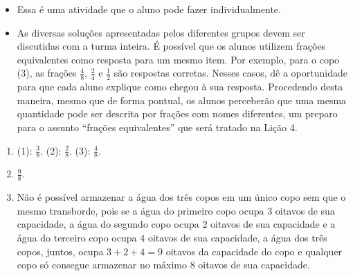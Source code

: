 \begin{multicols}{2}
\begin{orientacoes}
    \begin{itemize} %
    \item       Essa é uma atividade que o aluno pode fazer individualmente.
    \item       As diversas soluções apresentadas pelos diferentes grupos devem ser discutidas com a turma inteira. É possível que os alunos utilizem frações equivalentes como resposta para um mesmo item. Por exemplo, para o copo (3), as frações       $\frac{4}{8}$,       $\frac{2}{4}$ e       $\frac{1}{2}$ são respostas corretas. Nesses casos, dê a oportunidade para que cada aluno explique como chegou à sua resposta. Procedendo desta maneira, mesmo que de forma pontual, os alunos perceberão que uma mesma quantidade pode ser descrita por frações com nomes diferentes, um preparo para o assunto       ``frações equivalentes''     que será tratado na Lição 4.
\end{itemize} %


\end{orientacoes}

\begin{solucao}{}{}
\begin{enumerate} [\quad a)] %
    \item       (1):       $\frac{3}{8}$. (2):       $\frac{2}{8}$. (3):       $\frac{4}{8}$.
    \item             $\frac{9}{8}$.
    \item       Não é possível armazenar a água dos três copos em um único copo sem que o mesmo transborde, pois se a água do primeiro copo ocupa       $3$ oitavos de sua capacidade, a água do segundo copo ocupa       $2$ oitavos de sua capacidade e a água do terceiro copo ocupa       $4$ oitavos de sua capacidade, a água dos três copos, juntos, ocupa       $3 + 2 + 4 = 9$ oitavos da capacidade do copo e qualquer copo só consegue armazenar  no máximo $8$ oitavos de sua capacidade.
\end{enumerate} %


\end{solucao}
\end{multicols}
